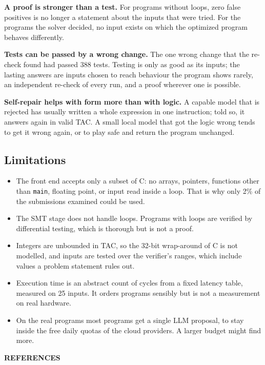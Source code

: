 \documentclass[12pt,a4paper]{report}
\begin{document}
\textbf{A proof is stronger than a test.} For programs without loops, zero false positives is no longer a statement about the inputs that were tried. For the programs the solver decided, no input exists on which the optimized program behaves differently.

\textbf{Tests can be passed by a wrong change.} The one wrong change that the re-check found had passed 388 tests. Testing is only as good as its inputs; the lasting answers are inputs chosen to reach behaviour the program shows rarely, an independent re-check of every run, and a proof wherever one is possible.

\textbf{Self-repair helps with form more than with logic.} A capable model that is rejected has usually written a whole expression in one instruction; told so, it answers again in valid TAC. A small local model that got the logic wrong tends to get it wrong again, or to play safe and return the program unchanged.

\subsection{Limitations}

\begin{itemize}[leftmargin=2cm]
  \item The front end accepts only a subset of C: no arrays, pointers, functions other than \texttt{main}, floating point, or input read inside a loop. That is why only 2\% of the submissions examined could be used.
  \item The SMT stage does not handle loops. Programs with loops are verified by differential testing, which is thorough but is not a proof.
  \item Integers are unbounded in TAC, so the 32-bit wrap-around of C is not modelled, and inputs are tested over the verifier's ranges, which include values a problem statement rules out.
  \item Execution time is an abstract count of cycles from a fixed latency table, measured on 25 inputs. It orders programs sensibly but is not a measurement on real hardware.
  \item On the real programs most programs get a single LLM proposal, to stay inside the free daily quotas of the cloud providers. A larger budget might find more.
\end{itemize}


\newpage
\begin{center}
{\fontsize{16}{20}\selectfont \textbf{REFERENCES}}
\end{center}
\vspace{0.3cm}
\end{document}
